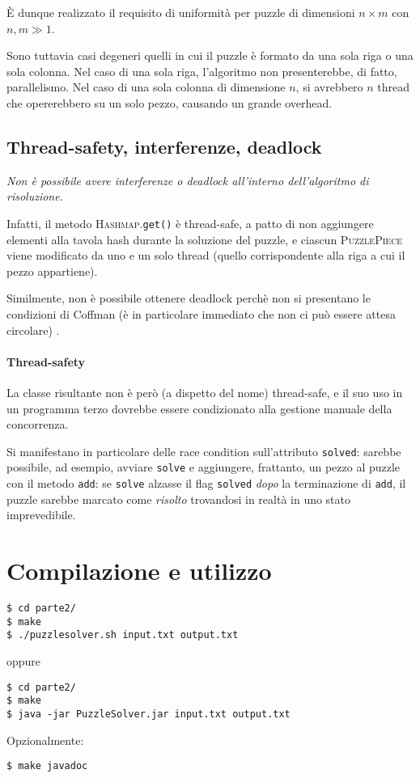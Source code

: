 \documentclass[a4paper]{article}
\newcommand{\Classname}[1]{\textsc{#1}}
\newcommand{\Methodname}[1]{\texttt{#1}}
\begin{document}
\`E dunque realizzato il requisito di uniformit\`a per puzzle di dimensioni $n \times m$ con $n, m \gg 1$.

Sono tuttavia casi degeneri quelli in cui il puzzle \`e formato da una sola riga o una sola colonna.
Nel caso di una sola riga, l'algoritmo non presenterebbe, di fatto, parallelismo.
Nel caso di una sola colonna di dimensione $n$, si avrebbero $n$ thread che opererebbero su un solo pezzo, causando un grande overhead.

\subsection{Thread-safety, interferenze, deadlock}
\emph{Non \`e possibile avere interferenze o deadlock all'interno dell'algoritmo di risoluzione}.

Infatti, il metodo \Classname{Hashmap}.\Methodname{get()} \`e thread-safe, a patto di non aggiungere elementi alla tavola hash durante la soluzione del puzzle, e ciascun \Classname{PuzzlePiece} viene modificato da uno e un solo thread (quello corrispondente alla riga a cui il pezzo appartiene).

Similmente, non \`e possibile ottenere deadlock perch\`e non si presentano le condizioni di Coffman (\`e in particolare immediato che non ci pu\`o essere attesa circolare) \cite{tanenbaum2001modern}.

\paragraph{Thread-safety} La classe risultante non \`e per\`o (a dispetto del nome) thread-safe, e il suo uso in un programma terzo dovrebbe essere condizionato alla gestione manuale della concorrenza.

Si manifestano in particolare delle race condition sull'attributo \Methodname{solved}: sarebbe possibile, ad esempio, avviare \Methodname{solve} e aggiungere, frattanto, un pezzo al puzzle con il metodo \Methodname{add}: se \Methodname{solve} alzasse il flag \Methodname{solved} \emph{dopo} la terminazione di \Methodname{add}, il puzzle sarebbe marcato come \emph{risolto} trovandosi in realt\`a in uno stato imprevedibile.



\section{Compilazione e utilizzo}
\begin{verbatim}
$ cd parte2/ 
$ make
$ ./puzzlesolver.sh input.txt output.txt
\end{verbatim}
oppure
\begin{verbatim}
$ cd parte2/ 
$ make
$ java -jar PuzzleSolver.jar input.txt output.txt
\end{verbatim}

Opzionalmente:
\begin{verbatim}
$ make javadoc
\end{verbatim}


{}

\end{document}
